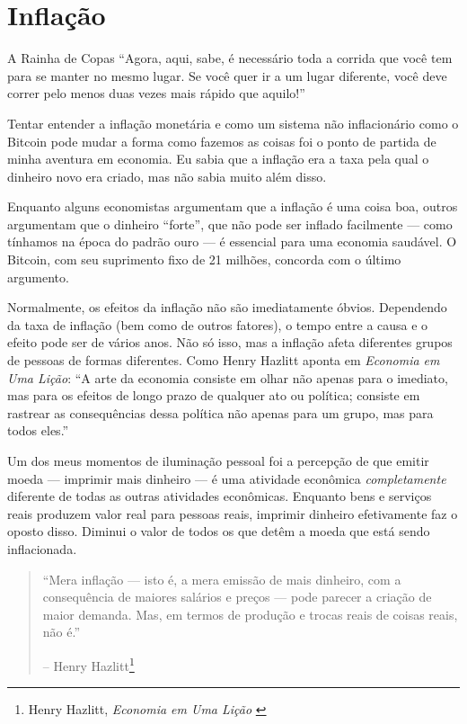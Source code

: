\chapter{Inflação}
\label{les:9}

\begin{chapquote}{A Rainha de Copas} %
\enquote{Agora, aqui, sabe, é necessário toda a corrida que você tem para se manter no mesmo lugar. Se você quer ir a um lugar diferente, você deve correr pelo menos duas vezes mais rápido que aquilo!}
\end{chapquote}

Tentar entender a inflação monetária e como um sistema não inflacionário como o Bitcoin pode mudar a forma como fazemos as coisas foi o ponto de partida de minha aventura em economia. Eu sabia que a inflação era a taxa pela qual o dinheiro novo era criado, mas não sabia muito além disso.

Enquanto alguns economistas argumentam que a inflação é uma coisa boa, outros argumentam que o dinheiro \enquote{forte}, que não pode ser inflado facilmente --- como tínhamos na época do padrão ouro --- é essencial para uma economia saudável. O Bitcoin, com seu suprimento fixo de 21 milhões, concorda com o último argumento.

Normalmente, os efeitos da inflação não são imediatamente óbvios. Dependendo da taxa de inflação (bem como de outros fatores), o tempo entre a causa e o efeito pode ser de vários anos. Não só isso, mas a inflação afeta diferentes grupos de pessoas de formas diferentes. Como Henry Hazlitt aponta em \textit{Economia em Uma Lição}: \enquote{A arte da economia consiste em olhar não apenas para o imediato, mas para os efeitos de longo prazo de qualquer ato ou política; consiste em rastrear as consequências dessa política não apenas para um grupo, mas para todos eles.}

Um dos meus momentos de iluminação pessoal foi a percepção de que emitir moeda --- imprimir mais dinheiro --- é uma atividade econômica \textit{completamente} diferente de todas as outras atividades econômicas. Enquanto bens e serviços reais produzem valor real para pessoas reais, imprimir dinheiro efetivamente faz o oposto disso. Diminui o valor de todos os que detêm a moeda que está sendo inflacionada.

\begin{quotation}\begin{samepage}
\enquote{Mera inflação --- isto é, a mera emissão de mais dinheiro, com a consequência de maiores salários e preços --- pode parecer a criação de maior demanda. Mas, em termos de produção e trocas reais de coisas reais, não é.}
\begin{flushright} -- Henry Hazlitt\footnote{Henry Hazlitt, \textit{Economia em Uma Lição} \cite{hazlitt}}
\end{flushright}\end{samepage}\end{quotation}

